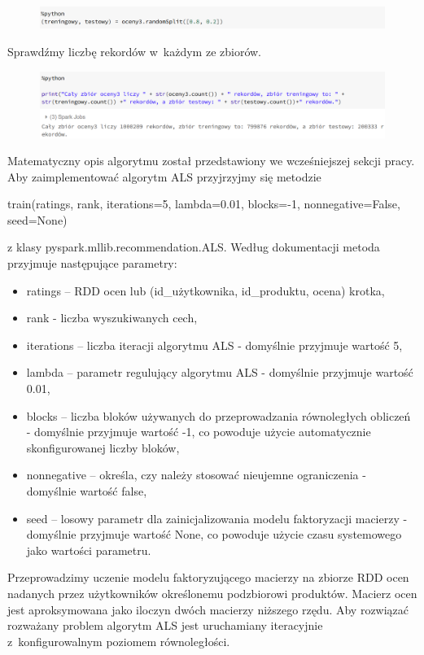 \documentclass[12pt,a4paper]{report}
\begin{document}
\begin{figure}[H]
\includegraphics[scale=0.5]{obrazy/ALS6.PNG} 
\end{figure}

Sprawdźmy liczbę rekordów w~każdym ze zbiorów.

\begin{figure}[H]
\includegraphics[scale=0.5]{obrazy/ALS7.PNG} 
\end{figure}

Matematyczny opis algorytmu został przedstawiony we wcześniejszej sekcji pracy.
Aby zaimplementować algorytm ALS przyjrzyjmy się metodzie 
\begin{center}
train(ratings, rank, iterations=5, lambda=0.01, blocks=-1, nonnegative=False, seed=None)
\end{center}
z klasy pyspark.mllib.recommendation.ALS. Według dokumentacji metoda przyjmuje następujące parametry:
\begin{itemize}
\item ratings – RDD ocen lub (id\_użytkownika, id\_produktu, ocena) krotka,
\item rank - liczba wyszukiwanych cech,
\item iterations – liczba iteracji algorytmu ALS - domyślnie przyjmuje wartość 5,
\item lambda – parametr regulujący algorytmu ALS - domyślnie przyjmuje wartość 0.01,
\item blocks – liczba bloków używanych do przeprowadzania równoległych obliczeń - domyślnie przyjmuje wartość -1, co powoduje użycie automatycznie skonfigurowanej liczby bloków,
\item nonnegative – określa, czy należy stosować nieujemne ograniczenia - domyślnie wartość false,
\item seed – losowy parametr dla zainicjalizowania modelu faktoryzacji macierzy - domyślnie przyjmuje wartość None, co powoduje użycie czasu systemowego jako wartości parametru.
\end{itemize}

Przeprowadzimy uczenie modelu faktoryzującego macierzy na zbiorze RDD ocen nadanych przez użytkowników określonemu podzbiorowi produktów. Macierz ocen jest aproksymowana jako iloczyn dwóch macierzy niższego rzędu. Aby rozwiązać rozważany problem algorytm ALS jest uruchamiany iteracyjnie z~konfigurowalnym poziomem równoległości.
\end{document}

